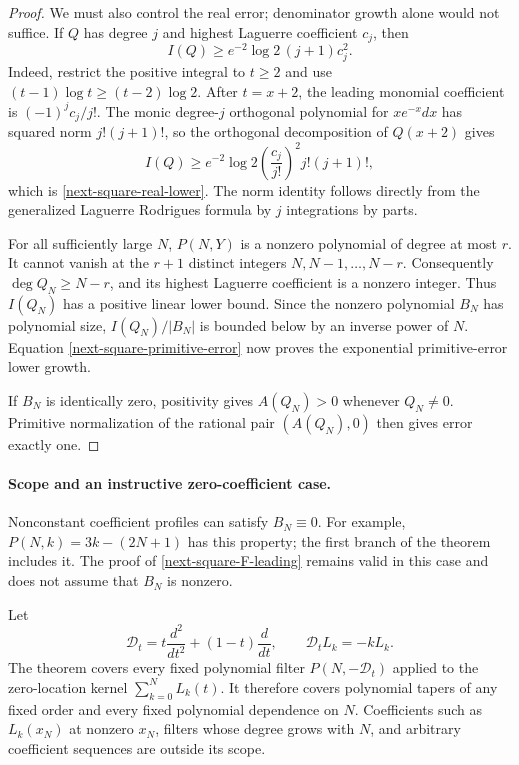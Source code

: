 \documentclass[11pt,a4paper]{article}
\theoremstyle{definition}
\theoremstyle{remark}
\begin{document}
\begin{proof}
We must also control the real error; denominator growth alone would
not suffice. If $Q$ has degree $j$ and highest Laguerre coefficient
$c_j$, then
\begin{equation}
 I(Q)\ge e^{-2}\log2\,(j+1)c_j^2.
 \label{next-square-real-lower}
\end{equation}
Indeed, restrict the positive integral to $t\ge2$ and use
$(t-1)\log t\ge(t-2)\log2$. After $t=x+2$, the leading monomial
coefficient is $(-1)^jc_j/j!$. The monic degree-$j$ orthogonal
polynomial for $xe^{-x}dx$ has squared norm $j!(j+1)!$, so the
orthogonal decomposition of $Q(x+2)$ gives
\[
 I(Q)\ge e^{-2}\log2
 \left(\frac{c_j}{j!}\right)^2j!(j+1)!,
\]
which is \eqref{next-square-real-lower}. The norm identity follows
directly from the generalized Laguerre Rodrigues formula by $j$
integrations by parts.

For all sufficiently large $N$, $P(N,Y)$ is a nonzero polynomial of
degree at most $r$. It cannot vanish at the $r+1$ distinct integers
$N,N-1,\ldots,N-r$. Consequently $\deg Q_N\ge N-r$, and its highest
Laguerre coefficient is a nonzero integer. Thus $I(Q_N)$ has a positive
linear lower bound. Since the nonzero polynomial $B_N$ has polynomial
size, $I(Q_N)/|B_N|$ is bounded below by an inverse power of $N$.
Equation \eqref{next-square-primitive-error} now proves the exponential
primitive-error lower growth.

If $B_N$ is identically zero, positivity gives $A(Q_N)>0$ whenever
$Q_N\ne0$. Primitive normalization of the rational pair $(A(Q_N),0)$
then gives error exactly one.
\end{proof}

\paragraph{Scope and an instructive zero-coefficient case.}
Nonconstant coefficient profiles can satisfy $B_N\equiv0$. For example,
$P(N,k)=3k-(2N+1)$ has this property; the first branch of the theorem
includes it. The proof of \eqref{next-square-F-leading} remains valid
in this case and does not assume that $B_N$ is nonzero.

Let
\[
 \mathcal D_t=t\frac{d^2}{dt^2}+(1-t)\frac d{dt},
 \qquad \mathcal D_tL_k=-kL_k.
\]
The theorem covers every fixed polynomial filter
$P(N,-\mathcal D_t)$ applied to the zero-location kernel
$\sum_{k=0}^N L_k(t)$. It therefore covers polynomial tapers of any
fixed order and every fixed polynomial dependence on $N$.
Coefficients such as $L_k(x_N)$ at nonzero $x_N$, filters whose degree
grows with $N$, and arbitrary coefficient sequences are outside its
scope.
\end{document}
